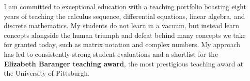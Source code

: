 I am committed to exceptional education with a teaching portfolio boasting eight years of teaching the calculus sequence, differential equations, linear algebra, and discrete mathematics.  My students do not learn in a vacuum, but instead learn concepts alongside the human triumph and defeat behind many concepts we take for granted today, such as matrix notation and complex numbers. My approach has led to consistently strong student evaluations and a shortlist for the \textbf{Elizabeth Baranger teaching award}, the most prestigious teaching award at the University of Pittsburgh.




